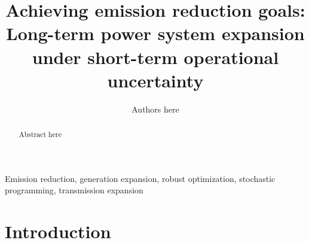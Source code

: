 \documentclass[final]{IEEEtran}
\begin{document}
\title{Achieving emission reduction goals: Long-term power system expansion under short-term operational uncertainty}
\author{Authors here}
\maketitle

\begin{abstract}
Abstract here
\end{abstract}
\begin{IEEEkeywords}
Emission reduction, generation expansion, robust optimization, stochastic programming, transmission expansion
\end{IEEEkeywords}

\section{Introduction}


\end{document}
